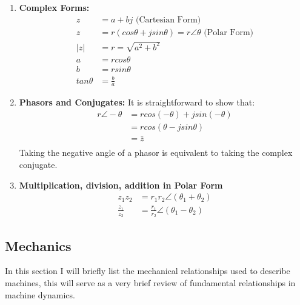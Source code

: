 \documentclass{book}
\begin{document}
\begin{enumerate}
	\item \textbf{Complex Forms:}
	\begin{align*}
		z &= a+bj \text{ (Cartesian Form)}\\
		z &= r(cos\theta + jsin\theta) = r\angle \theta \text{ (Polar Form)} \\
		|z| &= r = \sqrt{a^2 + b^2} \\
		a &= rcos\theta \\
		b &= rsin\theta \\
		tan\theta &= \frac{b}{a}
	\end{align*}
	\item \textbf{Phasors and Conjugates:} It is straightforward to show that:
	\begin{align*}
		r\angle -\theta &= rcos(-\theta) + jsin(-\theta) \\
		&= rcos(\theta - j sin \theta) \\
		&= \bar{z} \\
	\end{align*}
	Taking the negative angle of a phasor is equivalent to taking the complex conjugate.
	\item \textbf{Multiplication, division, addition in Polar Form}
	\begin{align*}
		z_1 z_2 &= r_1 r_2 \angle (\theta_1 + \theta_2) \\
		\frac{z_1}{z_2} &= \frac{r_1}{r_2} \angle (\theta_1 - \theta_2)
	\end{align*}
\end{enumerate}

\subsection{Mechanics}

In this section I will briefly list the mechanical relationships used to describe machines, this will serve as a very brief review of fundamental relationships in machine dynamics.
\end{document}
